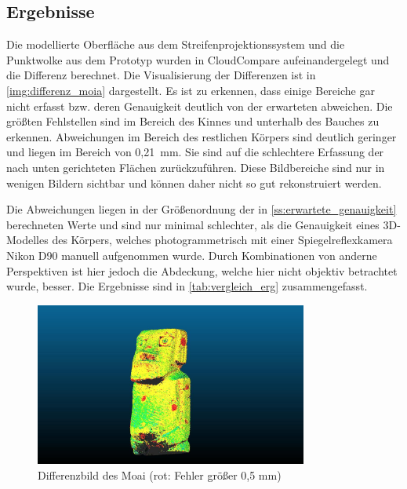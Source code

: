 \documentclass[./00PhotoBox.tex]{subfiles}
\begin{document}
\subsection{Ergebnisse}
Die modellierte Oberfläche aus dem Streifenprojektionssystem und die Punktwolke aus dem Prototyp wurden in CloudCompare aufeinandergelegt und die Differenz berechnet. Die Visualisierung der Differenzen ist in \autoref{img:differenz_moia} dargestellt. Es ist zu erkennen, dass einige Bereiche gar nicht erfasst bzw. deren Genauigkeit deutlich von der erwarteten abweichen. Die größten Fehlstellen sind im Bereich des Kinnes und unterhalb des Bauches zu erkennen. Abweichungen im Bereich des restlichen Körpers sind deutlich geringer und liegen im Bereich von 0,21~mm. Sie sind auf die schlechtere Erfassung der nach unten gerichteten Flächen zurückzuführen. Diese Bildbereiche sind nur in wenigen Bildern sichtbar und können daher nicht so gut rekonstruiert werden.

Die Abweichungen liegen in der Größenordnung der in \autoref{ss:erwartete_genauigkeit} berechneten Werte und sind nur minimal schlechter, als die Genauigkeit eines 3D-Modelles des Körpers, welches photogrammetrisch mit einer Spiegelreflexkamera Nikon D90 manuell aufgenommen wurde. Durch Kombinationen von anderne Perspektiven ist hier jedoch die Abdeckung, welche hier nicht objektiv betrachtet wurde, besser. Die Ergebnisse sind in \autoref{tab:vergleich_erg} zusammengefasst.

\begin{figure}
    \centering
    \includegraphics[width=0.8\textwidth]{img/moai_fehler.jpg}
    \caption{Differenzbild des Moai (rot: Fehler größer 0,5 mm)}
    \label{img:differenz_moia}
\end{figure}
\end{document}
